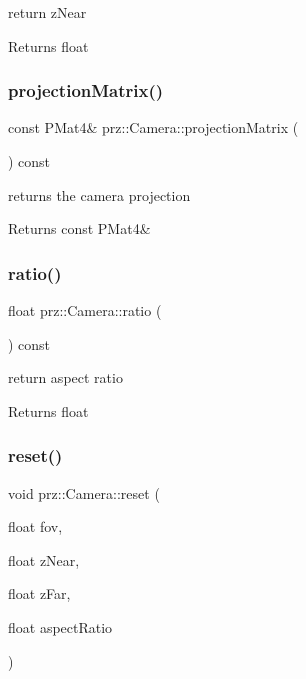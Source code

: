 return z\+Near 

\begin{DoxyReturn}{Returns}
float 
\end{DoxyReturn}
\mbox{\label{classprz_1_1_camera_aecd84c9c5a0575286dfd429a825822bb}} 
\subsubsection{\texorpdfstring{projectionMatrix()}{projectionMatrix()}}
{\footnotesize\ttfamily const P\+Mat4\& prz\+::\+Camera\+::projection\+Matrix (\begin{DoxyParamCaption}{ }\end{DoxyParamCaption}) const\hspace{0.3cm}{\ttfamily [inline]}}



returns the camera projection 

\begin{DoxyReturn}{Returns}
const P\+Mat4\& 
\end{DoxyReturn}
\mbox{\label{classprz_1_1_camera_a517dfb210de1064c5f13435bff78af6f}} 
\subsubsection{\texorpdfstring{ratio()}{ratio()}}
{\footnotesize\ttfamily float prz\+::\+Camera\+::ratio (\begin{DoxyParamCaption}{ }\end{DoxyParamCaption}) const\hspace{0.3cm}{\ttfamily [inline]}}



return aspect ratio 

\begin{DoxyReturn}{Returns}
float 
\end{DoxyReturn}
\mbox{\label{classprz_1_1_camera_aa2f75c0cf4f1458922fc9d128c671928}} 
\subsubsection{\texorpdfstring{reset()}{reset()}}
{\footnotesize\ttfamily void prz\+::\+Camera\+::reset (\begin{DoxyParamCaption}\item[{float}]{fov,  }\item[{float}]{z\+Near,  }\item[{float}]{z\+Far,  }\item[{float}]{aspect\+Ratio }\end{DoxyParamCaption})}



